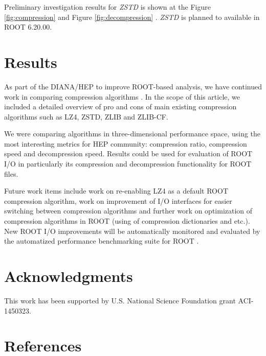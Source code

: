 \documentclass[12pt]{iopart}
\begin{document}
Preliminary investigation results for \textit{ZSTD} is shown at the Figure \ref{fig:compression} and Figure \ref{fig:decompression} . \textit{ZSTD} is planned to available in ROOT 6.20.00.

\section{Results}
As part of the DIANA/HEP to improve ROOT-based analysis, we have continued work in comparing compression algorithms \cite{brianzhe}. In the scope of this article, we included a detailed overview of pro and cons of main existing compression algorithms such as LZ4, ZSTD, ZLIB and ZLIB-CF.

We were comparing algorithms in three-dimensional performance space, using the most interesting metrics for HEP community: compression ratio, compression speed and decompression speed. Results could be used for evaluation of ROOT I/O in particularly its compression and decompression functionality for ROOT files. 

Future work items include work on re-enabling \textit{}{LZ4} as a default ROOT compression algorithm, work on improvement of I/O interfaces for easier switching between compression algorithms and further work on optimization of compression algorithms in ROOT (using of compression dictionaries and etc.). New ROOT I/O improvements will be automatically monitored and evaluated by the automatized performance benchmarking suite for ROOT \cite{rootbench}.

\section{Acknowledgments}

This work has been supported by U.S. National Science Foundation grant ACI-1450323.

\section{References}
\end{document}

